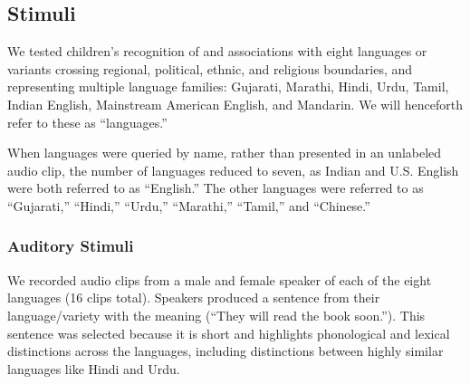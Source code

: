 \documentclass{foushee-adapted-preprint}
\begin{document}
\subsection*{Stimuli}
We tested children's recognition of and associations with eight languages or variants crossing regional, political, ethnic, and religious boundaries, and representing multiple language families: Gujarati, Marathi, Hindi, Urdu, Tamil, Indian English, Mainstream American English, and Mandarin. We will henceforth refer to these as ``languages.''

When languages were queried by name, rather than presented in an unlabeled audio clip, the number of languages reduced to seven, as Indian and U.S. English were both referred to as ``English.'' The other languages were referred to as ``Gujarati,'' ``Hindi,'' ``Urdu,'' ``Marathi,'' ``Tamil,'' and ``Chinese.'' 

\subsubsection*{Auditory Stimuli}
We recorded audio clips from a male and female speaker of each of the eight languages (16 clips total). %
Speakers produced a sentence from their language/variety with the meaning (``They will read the book soon.''). 
This sentence was selected because it is short and  highlights phonological and lexical distinctions across the languages, including distinctions between highly similar languages like Hindi and Urdu. 
\end{document}

